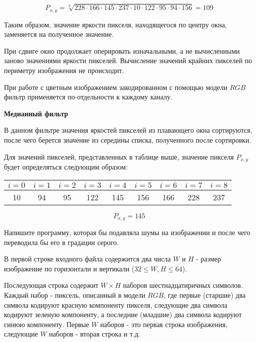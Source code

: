 $$P_{x,y} = \sqrt[9]{228\cdot166\cdot145\cdot237\cdot10\cdot122\cdot95\cdot94\cdot156} = 109$$

Таким образом, значение яркости пикселя, находящегося по центру окна, заменяется на полученное значение.

При сдвиге окно продолжает оперировать изначальными, а не вычисленными заново значениями яркости пикселей. Вычисление значений крайних пикселей по периметру изображения не происходит.

При работе с цветным изображением закодированном с помощью модели $RGB$ фильтр применяется по-отдельности к каждому каналу.

\textbf{Медианный фильтр}

В данном фильтре значения яркостей пикселей из плавающего окна сортируются, после чего берется значение из середины списка, полученного после сортировки.

Для значений пикселей, представленных в таблице выше, значение пикселя $P_{x,y}$ будет определяться следующим образом:

\begin{table}[H]
\centering
\begin{tabular}{ccccccccc}
\rowcolor[HTML]{EFEFEF} 
$i=0$                    & $i=1$                   & $i=2$                   & $i=3$                    & $i=4$                                            & $i=5$                    & $i=6$                    & $i=7$                    & $i=8$                    \\ \hline
\multicolumn{1}{|c|}{10} & \multicolumn{1}{c|}{94} & \multicolumn{1}{c|}{95} & \multicolumn{1}{c|}{122} & \multicolumn{1}{c|}{\cellcolor[HTML]{FFCE93}145} & \multicolumn{1}{c|}{156} & \multicolumn{1}{c|}{166} & \multicolumn{1}{c|}{228} & \multicolumn{1}{c|}{237} \\ \hline
\end{tabular}
\end{table}

$$P_{x,y} = 145$$

Напишите программу, которая бы подавляла шумы на изображении и после чего переводила бы его в градации серого.


В первой строке входного файла содержится два числа $W$ и $H$ - размер изображение по горизонтали и вертикали ($32 \le W, H \le 64$).

Последующая строка содержит $W \times H$ наборов шестнадцатиричных символов. Каждый набор - пиксель, описанный в модели $RGB$, где первые (старшие) два символа кодируют красную компоненту пикселя, следующие два символа кодируют зеленую компоненту, а последние (младшие) два символа кодируют синюю компоненту.
Первые $W$ наборов - это первая строка изображения, следующие $W$ наборов - вторая строка и т.д.

